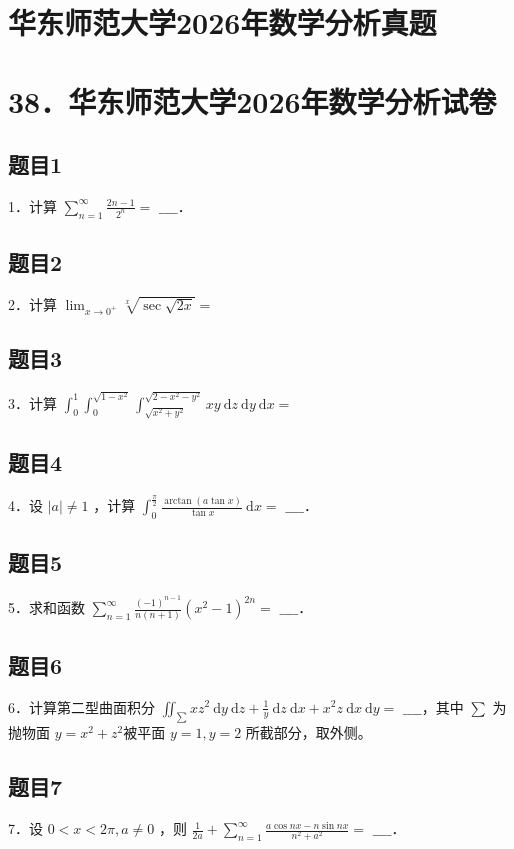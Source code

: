 \documentclass{article}
\begin{document}
\section*{华东师范大学2026年数学分析真题}
\section*{38．华东师范大学2026年数学分析试卷}

\subsection{题目1}
1．计算 \(\sum_{n=1}^{\infty} \frac{2 n-1}{2^{n}}=\) \(\_\_\_\_\)．

\subsection{题目2}
2．计算 \(\lim _{x \rightarrow 0^{+}} \sqrt[x]{\sec \sqrt{2 x}}=\)

\subsection{题目3}
3．计算 \(\int_{0}^{1} \int_{0}^{\sqrt{1-x^{2}}} \int_{\sqrt{x^{2}+y^{2}}}^{\sqrt{2-x^{2}-y^{2}}} x y \mathrm{~d} z \mathrm{~d} y \mathrm{~d} x=\)

\subsection{题目4}
4．设 \(|a| \neq 1\) ，计算 \(\int_{0}^{\frac{\pi}{2}} \frac{\arctan (a \tan x)}{\tan x} \mathrm{~d} x=\) \(\_\_\_\_\)．

\subsection{题目5}
5．求和函数 \(\sum_{n=1}^{\infty} \frac{(-1)^{n-1}}{n(n+1)}\left(x^{2}-1\right)^{2 n}=\) \(\_\_\_\_\)．

\subsection{题目6}
6．计算第二型曲面积分 \(\iint_{\sum} x z^{2} \mathrm{~d} y \mathrm{~d} z+\frac{1}{y} \mathrm{~d} z \mathrm{~d} x+x^{2} z \mathrm{~d} x \mathrm{~d} y=\) \(\_\_\_\_\)，其中 \(\sum\) 为抛物面 \(y=x^{2}+z^{2}\)被平面 \(y=1, y=2\) 所截部分，取外侧。

\subsection{题目7}
7．设 \(0<x<2 \pi, a \neq 0\) ，则 \(\frac{1}{2 a}+\sum_{n=1}^{\infty} \frac{a \cos n x-n \sin n x}{n^{2}+a^{2}}=\) \(\_\_\_\_\)．
\end{document}
